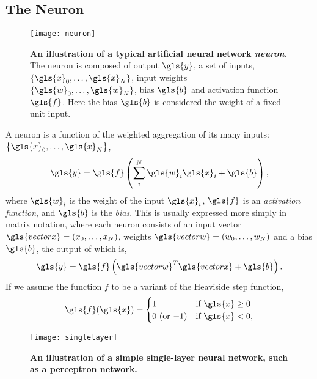 \documentclass[thesis]{subfiles}
\begin{document}
\subsection{The Neuron}
\begin{figure}[tbp]
\centering
\texttt{[image: neuron]}
\caption[An illustration of a typical artificial neural network neuron]{\textbf{An illustration of a typical artificial neural network \emph{neuron}.} The neuron is composed of output $\gls{y}$, a set of inputs, $\{\gls{x}_0, \ldots, \gls{x}_N\}$, input weights $\{\gls{w}_0, \ldots, \gls{w}_N\}$, bias $\gls{b}$ and activation function $\gls{f}$. Here the bias $\gls{b}$ is considered the weight of a fixed unit input.}
\label{fig:neuron}
\end{figure}
A neuron is a function of the weighted aggregation of its many inputs: $\left\{\gls{x}_0,\ldots,\gls{x}_N\right\}$,
%
\begin{equation}
	\gls{y} = \gls{f}\left(\sum_{i}^{N} \gls{w}_i \gls{x}_i + \gls{b}\right),
\end{equation}
%
where $\gls{w}_i$ is the weight of the input $\gls{x}_i$, $\gls{f}$ is an \emph{activation function}, and $\gls{b}$ is the \emph{bias}. This is usually expressed more simply in matrix notation, where each neuron consists of an input vector $\gls{vectorx}=(x_0,\ldots,x_N)$, weights $\gls{vectorw}=(w_0,\ldots,w_N)$ and a bias $\gls{b}$, the output of which is, %
%
\begin{equation}
    \gls{y} = \gls{f}\left(\gls{vectorw}^T\gls{vectorx} + \gls{b} \right).
\end{equation}
%
If we assume the function $f$ to be a variant of the Heaviside step function,
\begin{equation}
    \gls{f}(\gls{x}) = 
\begin{cases}
1 & \text{if } \gls{x} \geq 0\\
0 \textrm{ (or $-1$)} & \text{if } \gls{x} < 0,
\end{cases}
\end{equation}
%
\begin{figure}[tbp]
\centering
\texttt{[image: singlelayer]}
\caption[A single-layer neural network]{\textbf{An illustration of a simple single-layer neural network, such as a perceptron network.}}
\label{fig:singlelayer}
\end{figure}
\end{document}
